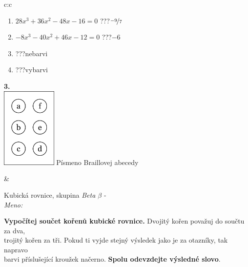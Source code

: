 \documentclass[10pt]{report}
\begin{document}
\begin{tabular}{c:c}
\begin{minipage}[c][104.5mm][t]{0.5\linewidth}
\begin{center}
\begin{minipage}{0.79\linewidth}
\begin{center}
\begin{varwidth}{\linewidth}
\begin{enumerate}
\item $28x^3+36x^2-48x-16=0$\quad \dotfill\; ???\;\dotfill \quad $\nicefrac{-9}{7}$
\item $-8x^3-40x^2+46x-12=0$\quad \dotfill\; ???\;\dotfill \quad $-6$
\item \quad \dotfill\; ???\;\dotfill \quad nebarvi
\item \quad \dotfill\; ???\;\dotfill \quad vybarvi
\end{enumerate}
\end{varwidth}
\end{center}
\end{minipage}
\begin{minipage}{0.20\linewidth}
\begin{center}
{\Huge\bfseries 3.} \\[2mm]
\includegraphics[height=40mm]{../images/braille.png}
{\small Písmeno Braillovej abecedy}
\end{center}
\end{minipage}
\end{center}
\end{minipage}
&
\begin{minipage}[c][104.5mm][t]{0.5\linewidth}
\begin{center}
\vspace{7mm}
{\huge Kubická rovnice, skupina \textit{Beta $\beta$} -}\\[5mm]
\textit{Meno:}\phantom{xxxxxxxxxxxxxxxxxxxxxxxxxxxxxxxxxxxxxxxxxxxxxxxxxxxxxxxxxxxxxxxxx}\\[5mm]
\begin{minipage}{0.95\linewidth}
\textbf{Vypočítej součet kořenů kubické rovnice.} Dvojitý kořen považuj do součtu za dva,\\trojitý kořen za tři. Pokud ti vyjde stejný výsledek jako je za otazníky, tak napravo\\barvi příslušející kroužek načerno. \textbf{Spolu odevzdejte výsledné slovo}.
\end{minipage}
\\[1mm]
\begin{minipage}{0.79\linewidth}
\begin{center}

\end{center}
\end{minipage}
\end{center}
\end{minipage}
\end{tabular}
\end{document}
